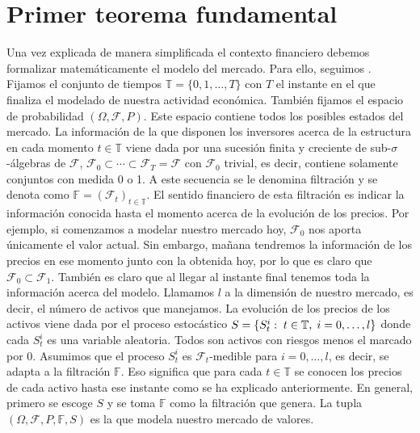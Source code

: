 \section{Primer teorema fundamental}
Una vez explicada de manera simplificada el contexto financiero debemos formalizar matemáticamente el modelo del mercado. Para ello, seguimos \cite{elliot1999mathematics}. Fijamos el conjunto de tiempos $ \mathbb{T} = \{0,1,\dots,T\}$ con $ T $ el instante en el que finaliza el modelado de nuestra actividad económica. También fijamos el espacio de probabilidad $ (\Omega, \mathcal{F}, P) $. Este espacio contiene todos los posibles estados del mercado. La información de la que disponen los inversores acerca de la estructura en cada momento $ t \in \mathbb{T}$ viene dada por una sucesión finita y creciente de sub-$ \sigma $-álgebras de $ \mathcal{F} $, $ \mathcal{F}_0 \subset \cdots \subset \mathcal{F}_T = \mathcal{F} $ con $ \mathcal{F}_0 $ trivial, es decir, contiene solamente conjuntos con medida 0 o 1. A este secuencia se le denomina filtración y se denota como $ \mathbb{F} = (\mathcal{F}_t)_{t \in \mathbb{T}} $. El sentido financiero de esta filtración es indicar la información conocida hasta el momento acerca de la evolución de los precios. Por ejemplo, si comenzamos a modelar nuestro mercado hoy, $ \mathcal{F}_0 $ nos aporta únicamente el valor actual. Sin embargo, mañana tendremos la información de los precios en ese momento junto con la obtenida hoy, por lo que es claro que $ \mathcal{F}_0 \subset \mathcal{F}_1  $. También es claro que al llegar al instante final tenemos toda la información acerca del modelo. Llamamos $ l  $ a la dimensión de nuestro mercado, es decir, el número de activos que manejamos. La evolución de los precios de los activos viene dada  por el proceso estocástico $ S = \{S^i_t:\hspace{1mm} t \in \mathbb{T},\hspace{1mm} i=0,\dots,l\} $ donde cada $ S^i_t $ es una variable aleatoria. Todos son activos con riesgos menos el marcado por $ 0 $. Asumimos que el proceso $ S_t^i $ es $ \mathcal{F}_t $-medible para $ i=0,\dots,l $, es decir, se adapta a la filtración $ \mathbb{F} $. Eso significa que para cada $ t \in \mathbb{T} $ se conocen los precios de cada activo hasta ese instante como se ha explicado anteriormente. En general, primero se escoge $ S $ y se toma $ \mathbb{F} $ como la filtración que genera. La tupla $ (\Omega, \mathcal{F}, P, \mathbb{F}, S) $ es la que modela nuestro mercado de valores. \\

